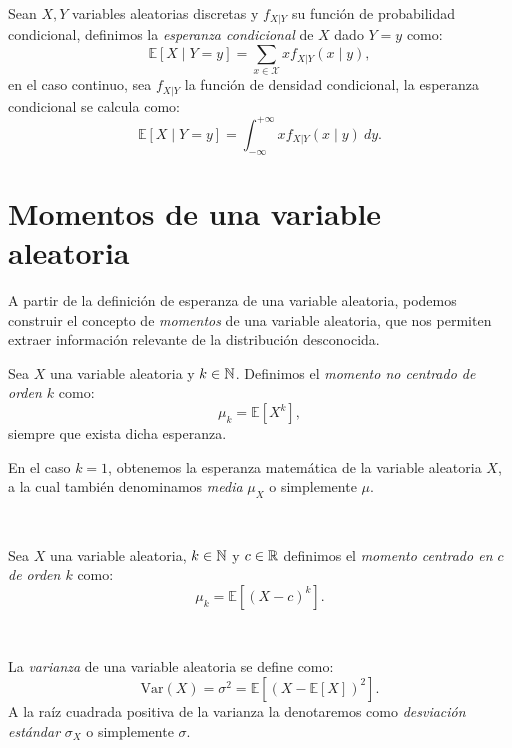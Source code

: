 \documentclass[oneside,openright,titlepage,numbers=noenddot,openany,headinclude,footinclude=true,
cleardoublepage=empty,abstractoff,BCOR=5mm,paper=a4,fontsize=12pt,main=spanish]{scrreprt}
\begin{document}
\begin{definition}
Sean $X,Y$ variables aleatorias discretas y $f_{X | Y}$ su función de probabilidad condicional, definimos la \textit{esperanza condicional} de $X$ dado $Y=y$ como: $$\mathbb{E}[X \mid Y=y]=\sum_{x\in \mathcal{X}} x f_{X | Y}(x \mid y),$$
en el caso continuo, sea $f_{X|Y}$ la función de densidad condicional, la esperanza condicional se calcula como: $$\mathbb{E}[X \mid Y=y]=\int_{-\infty}^{+\infty} x f_{X | Y}(x \mid y) \ dy.$$
\end{definition}

\clearpage

\section{Momentos de una variable aleatoria}

A partir de la definición de esperanza de una variable aleatoria, podemos construir el concepto de \textit{momentos} de una variable aleatoria, que nos permiten extraer información relevante de la distribución desconocida.\\

\begin{definition}
Sea $X$ una variable aleatoria y $k\in \mathbb N$. Definimos el \textit{momento no centrado de orden $k$} como: $$\mu_k=\mathbb{E}[X^k],$$
siempre que exista dicha esperanza.\\
\begin{remark}
En el caso $k=1$, obtenemos la esperanza matemática de la variable aleatoria $X$, a la cual también denominamos \textit{media} $\mu_X$ o simplemente $\mu$.
\end{remark}
\end{definition}\

\begin{definition}
Sea $X$ una variable aleatoria, $k\in \mathbb N$ y $c\in \mathbb{R}$ definimos el \textit{momento centrado en $c$ de orden $k$} como: $$\mu_k=\mathbb{E}[(X-c)^k].$$
\end{definition}\

\begin{definition}[Varianza]
La \textit{varianza} de una variable aleatoria se define como: $$\text{Var}(X)=\sigma
^2=\mathbb{E}\left[(X-\mathbb{E}[X])^2\right].$$
A la raíz cuadrada positiva de la varianza la denotaremos como \textit{desviación estándar} $\sigma_X$ o simplemente $\sigma$.
\end{definition}\
\end{document}
